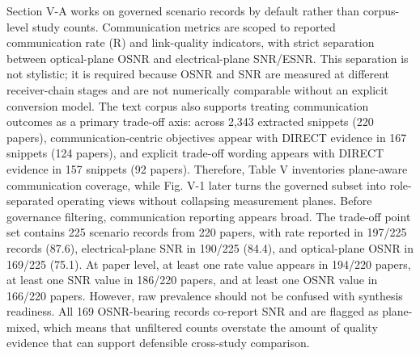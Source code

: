 {}\markdownRendererSectionBegin
{}\markdownRendererInterblockSeparator
{}Section V-A works on governed scenario records by default rather than corpus-level study counts. Communication metrics are scoped to reported communication rate (R) and link-quality indicators, with strict separation between optical-plane OSNR and electrical-plane SNR/ESNR. This separation is not stylistic; it is required because OSNR and SNR are measured at different receiver-chain stages and are not numerically comparable without an explicit conversion model. The text corpus also supports treating communication outcomes as a primary trade-off axis: across 2,343 extracted snippets (220 papers), communication-centric objectives appear with DIRECT evidence in 167 snippets (124 papers), and explicit trade-off wording appears with DIRECT evidence in 157 snippets (92 papers). Therefore, Table V inventories plane-aware communication coverage, while Fig. V-1 later turns the governed subset into role-separated operating views without collapsing measurement planes.\markdownRendererParagraphSeparator
{}\markdownRendererInterblockSeparator
{}\markdownRendererInterblockSeparator
{}Before governance filtering, communication reporting appears broad. The trade-off point set contains 225 scenario records from 220 papers, with rate reported in 197/225 records (87.6\markdownRendererPercentSign{}), electrical-plane SNR in 190/225 (84.4\markdownRendererPercentSign{}), and optical-plane OSNR in 169/225 (75.1\markdownRendererPercentSign{}). At paper level, at least one rate value appears in 194/220 papers, at least one SNR value in 186/220 papers, and at least one OSNR value in 166/220 papers. However, raw prevalence should not be confused with synthesis readiness. All 169 OSNR-bearing records co-report SNR and are flagged as plane-mixed, which means that unfiltered counts overstate the amount of quality evidence that can support defensible cross-study comparison.\markdownRendererParagraphSeparator
